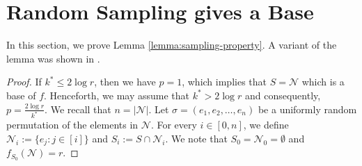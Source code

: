 \documentclass[11pt]{article}
\theoremstyle{definition}
\begin{document}
\section{Random Sampling gives a Base}\label{sec:random-sampling-to-get-base}
In this section, we prove Lemma \ref{lemma:sampling-property}. A variant of the lemma was shown in \cite{CCV09}. 
\lemmaRandomSamplingGivesBase*
\begin{proof}
    If $k^*\leq 2\log r$, then we have $p=1$, which implies that $S=\mathcal{N}$ which is a base of $f$. Henceforth, we may assume that $k^*>2\log r$ and consequently, $p=\frac{2\log r}{k^*}$. We recall that $n=|\mathcal{N}|$. Let $\sigma=(e_1, e_2, \ldots, e_n)$ be a uniformly random permutation of the elements in $\mathcal{N}$. For every $i\in [0,n]$, we define $\mathcal{N}_i:=\{e_j:j\in [i]\}$ and $S_i:=S\cap \mathcal{N}_i$. We note that $S_0=\mathcal{N}_0=\emptyset$ and $f_{S_0}(\mathcal{N})=r$.


\end{proof}
\end{document}
